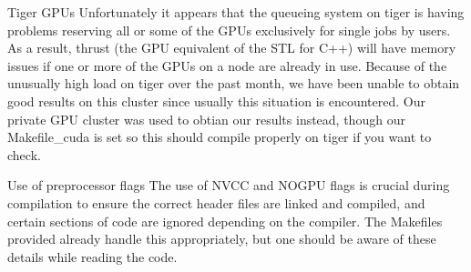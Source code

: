 \begin{DoxyEnumerate}
\item Tiger G\-P\-Us Unfortunately it appears that the queueing system on tiger is having problems reserving all or some of the G\-P\-Us exclusively for single jobs by users. As a result, thrust (the G\-P\-U equivalent of the S\-T\-L for C++) will have memory issues if one or more of the G\-P\-Us on a node are already in use. Because of the unusually high load on tiger over the past month, we have been unable to obtain good results on this cluster since usually this situation is encountered. Our private G\-P\-U cluster was used to obtian our results instead, though our Makefile\-\_\-cuda is set so this should compile properly on tiger if you want to check.
\end{DoxyEnumerate}


\begin{DoxyEnumerate}
\item Use of preprocessor flags The use of N\-V\-C\-C and N\-O\-G\-P\-U flags is crucial during compilation to ensure the correct header files are linked and compiled, and certain sections of code are ignored depending on the compiler. The Makefiles provided already handle this appropriately, but one should be aware of these details while reading the code. 
\end{DoxyEnumerate}